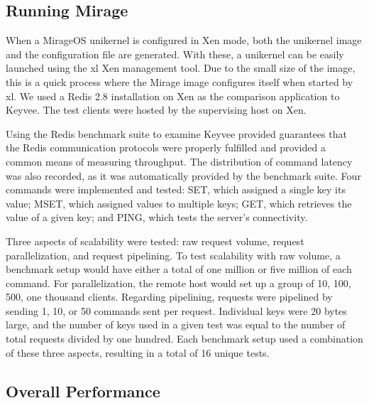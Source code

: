 \documentclass[english,10pt,twocolumn]{article}
\begin{document}
\subsection{Running Mirage}


When a MirageOS unikernel is configured in Xen mode, both the unikernel image and the configuration file are generated.
With these, a unikernel can be easily launched using the xl Xen management tool.
Due to the small size of the image, this is a quick process where the Mirage image configures itself when started by xl.
We used a Redis 2.8 installation on Xen as the comparison application to Keyvee.
The test clients were hosted by the supervising host on Xen.

Using the Redis benchmark suite to examine Keyvee provided guarantees that the Redis communication protocols were properly fulfilled and provided a common means of measuring throughput.
The distribution of command latency was also recorded, as it was automatically provided by the benchmark suite.
Four commands were implemented and tested: SET, which assigned a single key its value; MSET, which assigned values to multiple keys; GET, which retrieves the value of a given key; and PING, which tests the server's connectivity.

Three aspects of scalability were tested: raw request volume, request parallelization, and request pipelining.
To test scalability with raw volume, a benchmark setup would have either a total of one million or five million of each command.
For parallelization, the remote host would set up a group of 10, 100, 500, one thousand clients.
Regarding pipelining, requests were pipelined by sending 1, 10, or 50 commands sent per request.
Individual keys were 20 bytes large, and the number of keys used in a given test was equal to the number of total requests divided by one hundred.
Each benchmark setup used a combination of these three aspects, resulting in a total of 16 unique tests.

\subsection{Overall Performance}
\end{document}
